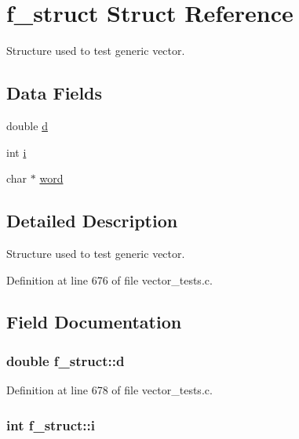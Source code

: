 \hypertarget{structf__struct}{\section{f\-\_\-struct Struct Reference}
\label{structf__struct}
}


Structure used to test generic vector.  


\subsection*{Data Fields}
\begin{DoxyCompactItemize}
\item 
double \hyperlink{structf__struct_aabfd173ef817f4c258a9e55aaa2ec9cf}{d}
\item 
int \hyperlink{structf__struct_a87df300d9aa87b7df7cba13e548c948f}{i}
\item 
char $\ast$ \hyperlink{structf__struct_a2f602b9f217951fe83dd040b4fd79687}{word}
\end{DoxyCompactItemize}


\subsection{Detailed Description}
Structure used to test generic vector. 



Definition at line 676 of file vector\-\_\-tests.\-c.



\subsection{Field Documentation}
\hypertarget{structf__struct_aabfd173ef817f4c258a9e55aaa2ec9cf}{
\subsubsection[{d}]{\setlength{\rightskip}{0pt plus 5cm}double f\-\_\-struct\-::d}}\label{structf__struct_aabfd173ef817f4c258a9e55aaa2ec9cf}


Definition at line 678 of file vector\-\_\-tests.\-c.

\hypertarget{structf__struct_a87df300d9aa87b7df7cba13e548c948f}{
\subsubsection[{i}]{\setlength{\rightskip}{0pt plus 5cm}int f\-\_\-struct\-::i}}\label{structf__struct_a87df300d9aa87b7df7cba13e548c948f}


